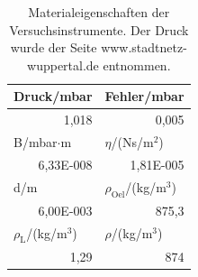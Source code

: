 \documentclass[12pt]{scrartcl}
\begin{document}
\begin{table}[H]
\caption{Materialeigenschaften der Versuchsinstrumente. Der Druck wurde der Seite www.stadtnetz-wuppertal.de entnommen.}
\begin{center}
\begin{tabular}{|l|l|}
\hline
Druck/mbar & Fehler/mbar \\ \hline
\multicolumn{1}{|r|}{1,018} & \multicolumn{1}{r|}{0,005} \\ \hline
B/mbar$\cdot$m & $\eta$/(Ns/m$^2$) \\ \hline
\multicolumn{1}{|r|}{6,33E-008} & \multicolumn{1}{r|}{1,81E-005} \\ \hline
d/m & $\rho_\text{Oel}$/(kg/m$^3$) \\ \hline
\multicolumn{1}{|r|}{6,00E-003} & \multicolumn{1}{r|}{875,3} \\ \hline
$\rho_\text{L}$/(kg/m$^3$) & $\rho$/(kg/m$^3$) \\ \hline
\multicolumn{1}{|r|}{1,29} & \multicolumn{1}{r|}{874} \\ \hline
\end{tabular}
\end{center}
\label{tab:messwerte_m}
\end{table}
\end{document}
